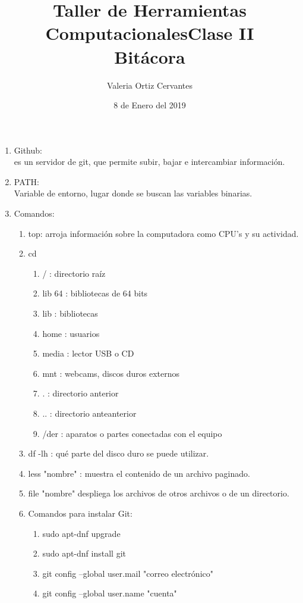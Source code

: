 \documentclass{article}
\title{\Huge Taller de Herramientas Computacionales}
\author{Valeria Ortiz Cervantes}
\date{8 de Enero del 2019}
\begin{document}
	\maketitle
	\newpage
	\title{Clase II\\Bitácora\\}
	\begin{enumerate}
		\item Github:\\ es un servidor de git, que permite subir, bajar e intercambiar información.
		\item  PATH:\\ Variable de entorno, lugar donde se buscan las variables binarias.
		\item Comandos:
		\begin{enumerate}
			\item top: arroja información sobre la computadora como CPU's y su actividad.
			\item cd
			\begin{enumerate}
				\item  / : directorio raíz 
				\item lib 64 : bibliotecas de 64 bits
				\item lib : bibliotecas
				\item home : usuarios
				\item media : lector USB o CD
				\item mnt : webcams, discos duros externos
				\item . : directorio anterior
				\item .. : directorio anteanterior
				\item /der : aparatos o partes conectadas con el equipo 
			\end{enumerate}
			\item df -lh : qué parte del disco duro se puede utilizar. 
			\item less "nombre" : muestra el contenido de un archivo paginado. 
			\item file "nombre" despliega los archivos de otros archivos o de un directorio. 
			\item Comandos para instalar Git:
			\begin{enumerate}
				\item sudo apt-dnf upgrade
				\item sudo apt-dnf install git
				\item git config --global user.mail "correo electrónico"
				\item git config --global user.name "cuenta"

\end{enumerate}
\end{enumerate}
\end{enumerate}
\end{document}

